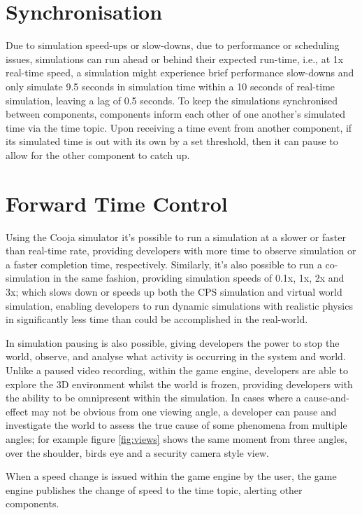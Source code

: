 \section{Synchronisation} %
\label{sec:synchronisation}
Due to simulation speed-ups or slow-downs, due to performance or scheduling issues, simulations can run ahead or behind their expected run-time, i.e., at 1x real-time speed, a simulation might experience brief performance slow-downs and only simulate 9.5 seconds in simulation time within a 10 seconds of real-time simulation, leaving a lag of 0.5 seconds. To keep the simulations synchronised between components, components inform each other of one another's simulated time via the time topic. Upon receiving a time event from another component, if its simulated time is out with its own by a set threshold, then it can pause to allow for the other component to catch up.



\section{Forward Time Control} %
\label{sec:time_control}
Using the Cooja simulator it's possible to run a simulation at a slower or faster than real-time rate, providing developers with more time to observe simulation or a faster completion time, respectively. Similarly, it's also possible to run a co-simulation in the same fashion, providing simulation speeds of 0.1x, 1x, 2x and 3x; which slows down or speeds up both the CPS simulation and virtual world simulation, enabling developers to run dynamic simulations with realistic physics in significantly less time than could be accomplished in the real-world. 

In simulation pausing is also possible, giving developers the power to stop the world, observe, and analyse what activity is occurring in the system and world. Unlike a paused video recording, within the game engine, developers are able to explore the 3D environment whilst the world is frozen, providing developers with the ability to be omnipresent within the simulation. In cases where a cause-and-effect may not be obvious from one viewing angle, a developer can pause and investigate the world to assess the true cause of some phenomena from multiple angles; for example figure \ref{fig:views} shows the same moment from three angles, over the shoulder, birds eye and a security camera style view.

When a speed change is issued within the game engine by the user, the game engine publishes the change of speed to the time topic, alerting other components. 


